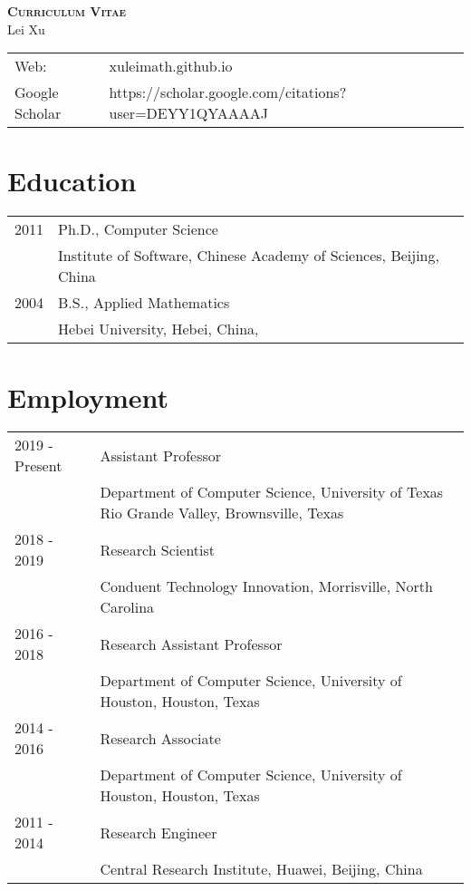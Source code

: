 





\begin{center}
    \textbf{\textsc{Curriculum Vitae}}\\
    Lei Xu
\end{center}

\begin{longtable}{p{1in}p{5in}}
    Web: &	xuleimath.github.io\\
    Google Scholar     &  https://scholar.google.com/citations?user=DEYY1QYAAAAJ \\
\end{longtable}

\section*{Education}

\begin{longtable}{p{1in}p{5in}}
    2011 &	Ph.D., Computer Science\\
         &  Institute of Software, Chinese Academy of Sciences, Beijing, China\\
    2004 &	B.S., Applied Mathematics\\
         &  Hebei University, Hebei, China, \\
\end{longtable}


\section*{Employment}
\begin{longtable}{p{1in}p{5in}}
    2019 - Present	&	Assistant Professor\\
                    &   Department of Computer Science, University of Texas Rio Grande Valley, Brownsville, Texas\\ 

    2018 - 2019		&Research Scientist\\
                    &Conduent Technology Innovation, Morrisville, North Carolina\\

    2016 - 2018		&Research Assistant Professor\\
                    &Department of Computer Science, University of Houston, Houston, Texas\\

    2014 - 2016		&Research Associate\\
                    &Department of Computer Science, University of Houston, Houston, Texas\\

    2011 - 2014		&Research Engineer\\
                    &Central Research Institute, Huawei, Beijing, China\\
\end{longtable}

